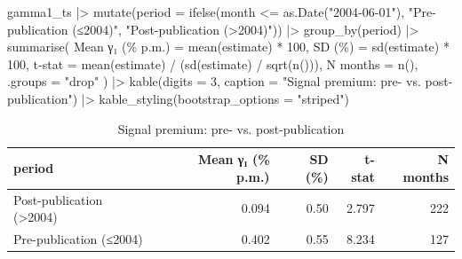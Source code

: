 \documentclass[
  letterpaper,
  DIV=11,
  numbers=noendperiod]{scrartcl}
\newenvironment{Shaded}{\begin{snugshade}}{\end{snugshade}}
\newcommand{\AttributeTok}[1]{\textcolor[rgb]{0.40,0.45,0.13}{#1}}
\newcommand{\DecValTok}[1]{\textcolor[rgb]{0.68,0.00,0.00}{#1}}
\newcommand{\FunctionTok}[1]{\textcolor[rgb]{0.28,0.35,0.67}{#1}}
\newcommand{\NormalTok}[1]{\textcolor[rgb]{0.00,0.23,0.31}{#1}}
\newcommand{\OtherTok}[1]{\textcolor[rgb]{0.00,0.23,0.31}{#1}}
\newcommand{\SpecialCharTok}[1]{\textcolor[rgb]{0.37,0.37,0.37}{#1}}
\newcommand{\StringTok}[1]{\textcolor[rgb]{0.13,0.47,0.30}{#1}}
\begin{document}
\begin{Shaded}
\begin{Highlighting}[]
\NormalTok{gamma1\_ts }\SpecialCharTok{|\textgreater{}}
  \FunctionTok{mutate}\NormalTok{(}\AttributeTok{period =} \FunctionTok{ifelse}\NormalTok{(month }\SpecialCharTok{\textless{}=} \FunctionTok{as.Date}\NormalTok{(}\StringTok{"2004{-}06{-}01"}\NormalTok{),}
                         \StringTok{"Pre{-}publication (≤2004)"}\NormalTok{, }\StringTok{"Post{-}publication (\textgreater{}2004)"}\NormalTok{)) }\SpecialCharTok{|\textgreater{}}
  \FunctionTok{group\_by}\NormalTok{(period) }\SpecialCharTok{|\textgreater{}}
  \FunctionTok{summarise}\NormalTok{(}
    \StringTok{\textasciigrave{}}\AttributeTok{Mean γ₁ (\% p.m.)}\StringTok{\textasciigrave{}} \OtherTok{=} \FunctionTok{mean}\NormalTok{(estimate) }\SpecialCharTok{*} \DecValTok{100}\NormalTok{,}
    \StringTok{\textasciigrave{}}\AttributeTok{SD (\%)}\StringTok{\textasciigrave{}} \OtherTok{=} \FunctionTok{sd}\NormalTok{(estimate) }\SpecialCharTok{*} \DecValTok{100}\NormalTok{,}
    \StringTok{\textasciigrave{}}\AttributeTok{t{-}stat}\StringTok{\textasciigrave{}} \OtherTok{=} \FunctionTok{mean}\NormalTok{(estimate) }\SpecialCharTok{/}\NormalTok{ (}\FunctionTok{sd}\NormalTok{(estimate) }\SpecialCharTok{/} \FunctionTok{sqrt}\NormalTok{(}\FunctionTok{n}\NormalTok{())),}
    \StringTok{\textasciigrave{}}\AttributeTok{N months}\StringTok{\textasciigrave{}} \OtherTok{=} \FunctionTok{n}\NormalTok{(), }\AttributeTok{.groups =} \StringTok{"drop"}
\NormalTok{  ) }\SpecialCharTok{|\textgreater{}}
  \FunctionTok{kable}\NormalTok{(}\AttributeTok{digits =} \DecValTok{3}\NormalTok{, }\AttributeTok{caption =} \StringTok{"Signal premium: pre{-} vs. post{-}publication"}\NormalTok{) }\SpecialCharTok{|\textgreater{}}
  \FunctionTok{kable\_styling}\NormalTok{(}\AttributeTok{bootstrap\_options =} \StringTok{"striped"}\NormalTok{)}
\end{Highlighting}
\end{Shaded}

\begin{longtable}[t]{lrrrr}
\caption{\label{tab:subsample}Signal premium: pre- vs. post-publication}\\
\toprule
period & Mean γ₁ (\% p.m.) & SD (\%) & t-stat & N months\\
\midrule
Post-publication (>2004) & 0.094 & 0.50 & 2.797 & 222\\
Pre-publication (≤2004) & 0.402 & 0.55 & 8.234 & 127\\
\bottomrule
\end{longtable}
\end{document}
